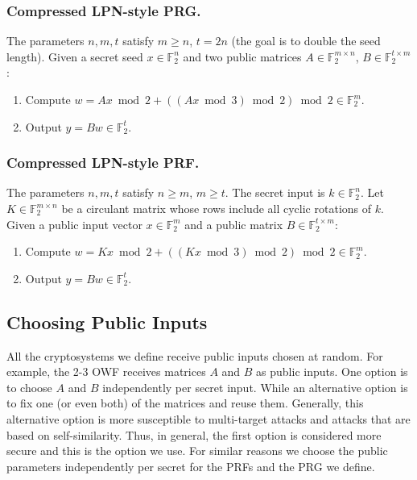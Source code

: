 \documentclass[orivec,envcountsect]{llncs}
\begin{document}
\subsubsection{Compressed LPN-style PRG.}

The parameters $n,m,t$ satisfy $m \geq n$, $t = 2n$ (the goal is to double the seed length).
Given a secret seed $x \in \mathbb{F}_2^n$ and
two public matrices $A \in \mathbb{F}_2^{m \times n}$,
$B \in \mathbb{F}_2^{t \times m}$:
\begin{enumerate}
  \item Compute $w = Ax \bmod 2 + ((Ax \bmod 3) \bmod 2) \bmod 2 \in \mathbb{F}_2^m$.
  \item Output $y = Bw \in \mathbb{F}_2^t$.
\end{enumerate}

\subsubsection{Compressed LPN-style PRF.}

The parameters $n,m,t$ satisfy $n \geq m$, $m \geq t$.
The secret input is $k \in \mathbb{F}_2^{n}$.
Let $K \in \mathbb{F}_2^{m \times n}$ be a circulant matrix 
whose rows include all cyclic rotations of $k$.
Given a public input vector $x \in \mathbb{F}^{m}_2$ and
a public matrix $B \in \mathbb{F}_2^{t \times m}$:
\begin{enumerate}
  \item Compute $w = Kx \bmod 2 + ((Kx \bmod 3) \bmod 2) \bmod 2 \in \mathbb{F}_2^m$.
  \item Output $y = Bw \in \mathbb{F}_2^t$.
\end{enumerate}

\subsection{Choosing Public Inputs}

All the cryptosystems we define receive public inputs chosen at random.
For example, the 2-3 OWF receives matrices $A$ and $B$ as public inputs.
One option is to choose $A$ and $B$ independently per secret input.
While an alternative option is to fix one (or even both) of the matrices and reuse them.
Generally, this alternative option is more susceptible to multi-target
attacks and attacks that are based on self-similarity.
Thus, in general, the first option is considered more secure and this is the option we use.
For similar reasons we choose the public parameters independently per secret for the
PRFs and the PRG we define.
\end{document}
